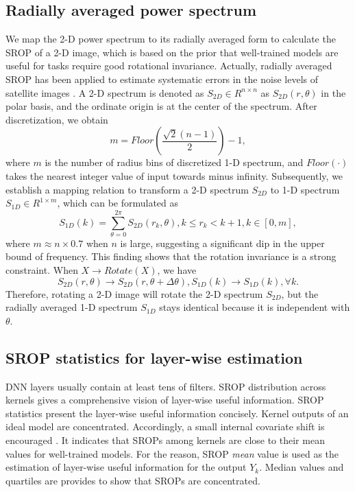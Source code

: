 \documentclass{article}
\begin{document}
\subsection{Radially averaged power spectrum}
We map the 2-D power spectrum to its radially averaged form to calculate the SROP of a 2-D image, which is based on the prior that well-trained models are useful for tasks require good rotational invariance. Actually, radially averaged SROP has been applied to estimate systematic errors in the noise levels of satellite images \cite{2dSROP}. A 2-D spectrum is denoted as $S_{2D}\in R^{n\times n}$ as $S_{2D}(r,\theta)$ in the polar basis, and the ordinate origin is at the center of the spectrum. After discretization, we obtain
\begin{equation}
    m=Floor(\frac{\sqrt{2}(n-1)}{2})-1,
\end{equation}
where $m$ is the number of radius bins of discretized 1-D spectrum, and $Floor(\cdot)$ takes the nearest integer value of input towards minus infinity. Subsequently, we establish a mapping relation to transform a 2-D spectrum $S_{2D}$ to 1-D spectrum $S_{1D}\in R^{1\times m}$, which can be formulated as
\begin{equation}
    S_{1D}(k)=\sum_{\theta=0}^{2\pi}S_{2D}(r_k,\theta), k\leq r_k<k+1, k\in [0,m],
\end{equation}
where $m\approx n\times 0.7$ when $n$ is large, suggesting a significant dip in the upper bound of frequency. This finding shows that the rotation invariance is a strong constraint.
When $X\rightarrow Rotate(X)$, we have
\begin{equation}
 S_{2D}(r,\theta)\rightarrow S_{2D}(r,\theta+\Delta \theta),
 S_{1D}(k)\rightarrow S_{1D}(k), \forall k.
\end{equation}
Therefore, rotating a 2-D image will rotate the 2-D spectrum $S_{2D}$, but the radially averaged 1-D spectrum $S_{1D}$ stays identical because it is independent with $\theta$.

\subsection{SROP statistics for layer-wise estimation}
\label{secsec:statistics}
DNN layers usually contain at least tens of filters. SROP distribution across kernels gives a comprehensive vision of layer-wise useful information. SROP statistics present the layer-wise useful information concisely. Kernel outputs of an ideal model are concentrated. Accordingly, a small internal covariate shift is encouraged \cite{bn}. It indicates that SROPs among kernels are close to their mean values for well-trained models. For the reason, SROP \textit{mean} value is used as the estimation of layer-wise useful information for the output $Y_k$. Median values and quartiles are provides to show that SROPs are concentrated. 
\end{document}
